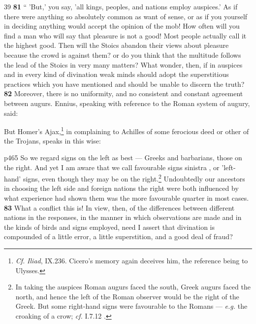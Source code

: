 39
\textbf{81} `` 'But,' you say, 'all kings, peoples, and nations employ auspices.' As if there were anything so absolutely common as want of sense, or as if you yourself in deciding anything would accept the opinion of the mob! How often will you find a man who will say that pleasure is not a good! Most people actually call it the highest good. Then will the Stoics abandon their views about pleasure because the crowd is against them? or do you think that the multitude follows the lead of the Stoics in very many matters? What wonder, then, if in auspices and in every kind of divination weak minds should adopt the superstitious practices which you have mentioned and should be unable to discern the truth? \textbf{82} Moreover, there is no uniformity, and no consistent and constant agreement between augurs. Ennius, speaking with reference to the Roman system of augury, said:

But Homer's Ajax,\texthebrew{}\footnote{\emph{Cf.} \emph{Iliad}, IX.236. Cicero's memory again deceives him, the reference being to Ulysses.

} in complaining to Achilles of some ferocious deed or other of the Trojans, speaks in this wise:

p465
So we regard signs on the left as best \texthebrew{—} Greeks and barbarians, those on the right. And yet I am aware that we call favourable signs sinistra , or 'left-hand' signs, even though they may be on the right.\texthebrew{}\footnote{In taking the auspices Roman augurs faced the south, Greek augurs faced the north, and hence the left of the Roman observer would be the right of the Greek. But some right-hand signs were favourable to the Romans \texthebrew{—} \emph{e.g.} the croaking of a crow; \emph{cf.}
I.7.12 .

} Undoubtedly our ancestors in choosing the left side and foreign nations the right were both influenced by what experience had shown them was the more favourable quarter in most cases. \textbf{83} What a conflict this is! In view, then, of the differences between different nations in the responses, in the manner in which observations are made and in the kinds of birds and signs employed, need I assert that divination is compounded of a little error, a little superstition, and a good deal of fraud?

